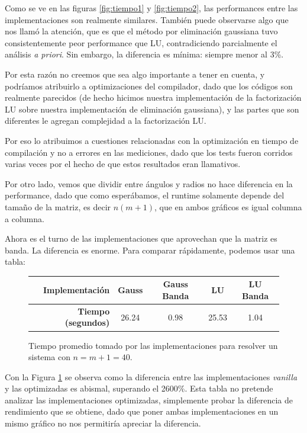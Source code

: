 Como se ve en las figuras \ref{fig:tiempo1} y \ref{fig:tiempo2}, las performances entre las implementaciones son realmente similares. También puede observarse algo que nos llamó la atención, que es que el método por eliminación gaussiana tuvo consistentemente peor performance que LU, contradiciendo parcialmente el análisis \emph{a priori}. Sin embargo, la diferencia es mínima: siempre menor al 3\%.

Por esta razón no creemos que sea algo importante a tener en cuenta, y podríamos atribuirlo a optimizaciones del compilador, dado que los códigos son realmente parecidos (de hecho hicimos nuestra implementación de la factorización LU sobre nuestra implementación de eliminación gaussiana), y las partes que son diferentes le agregan complejidad a la factorización LU.

Por eso lo atribuimos a cuestiones relacionadas con la optimización en tiempo de compilación y no a errores en las mediciones, dado que los tests fueron corridos varias veces por el hecho de que estos resultados eran llamativos.


Por otro lado, vemos que dividir entre ángulos y radios no hace diferencia en la performance, dado que como esperábamos, el runtime solamente depende del tamaño de la matriz, es decir $n (m+1)$, que en ambos gráficos es igual columna a columna.


Ahora es el turno de las implementaciones que aprovechan que la matriz es banda.
La diferencia es enorme. Para comparar rápidamente, podemos usar una tabla:


\begin{figure}[H]
\centering
\begin{tabular}{|r | c  c  c  c|}
\hline
  \textbf{Implementación} & Gauss & Gauss Banda & LU & LU Banda\\ \hline
  \textbf{Tiempo (segundos)} & 26.24 & 0.98 & 25.53 & 1.04 \\
\hline
\end{tabular}

  \caption{\footnotesize{Tiempo promedio tomado por las implementaciones para resolver un sistema con $n = m+1 = 40$.}}
  \label{fig:tiempocomp}
\end{figure}

Con la Figura \ref{fig:tiempocomp} se observa como la diferencia entre las implementaciones \emph{vanilla} y las optimizadas es abismal, superando el 2600\%. Esta tabla no pretende analizar las implementaciones optimizadas, simplemente probar la diferencia de rendimiento que se obtiene, dado que poner ambas implementaciones en un mismo gráfico no nos permitiría apreciar la diferencia.

